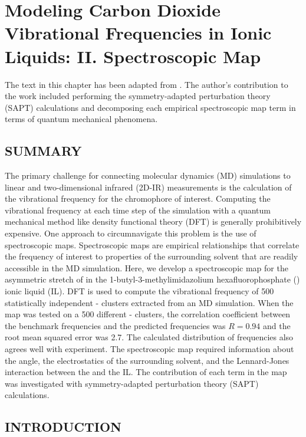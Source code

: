 \documentclass[%
  class = book,%
  crop = false,%
  float = true,%
  multi = true,%
  preview = false,%
]{standalone}
\newcommand{\caps}[1]{\uppercase{#1}}
\begin{document}
\chapter[\ce{CO2}-IL Spectroscopic Map Development]{Modeling Carbon Dioxide Vibrational Frequencies in Ionic Liquids: II. Spectroscopic Map}
\label{ch:paper_03}

The text in this chapter has been adapted from . The author's contribution to the work included performing the symmetry-adapted perturbation theory (SAPT) calculations and decomposing each empirical spectroscopic map term in terms of quantum mechanical phenomena.

\section{\texorpdfstring{\caps{Summary}}{Summary}}

The primary challenge for connecting molecular dynamics (MD) simulations to linear and two-dimensional infrared (2D-IR) measurements is the calculation of the vibrational frequency for the chromophore of interest. Computing the vibrational frequency at each time step of the simulation with a quantum mechanical method like density functional theory (DFT) is generally prohibitively expensive. One approach to circumnavigate this problem is the use of spectroscopic maps. Spectroscopic maps are empirical relationships that correlate the frequency of interest to properties of the surrounding solvent that are readily accessible in the MD simulation. Here, we develop a spectroscopic map for the asymmetric stretch of  in the 1-butyl-3-methylimidazolium hexafluorophosphate (\ce{[C4C1im][PF6]}) ionic liquid (IL). DFT is used to compute the vibrational frequency of \num{500} statistically independent -\ce{[C4C1im][PF6]} clusters extracted from an MD simulation. When the map was tested on a \num{500} different -\ce{[C4C1im][PF6]} clusters, the correlation coefficient between the benchmark frequencies and the predicted frequencies was \(R = 0.94\) and the root mean squared error was \SI{2.7}{\wavenumber}. The calculated distribution of frequencies also agrees well with experiment. The spectroscopic map required information about the  angle, the electrostatics of the surrounding solvent, and the Lennard-Jones interaction between the  and the IL. The contribution of each term in the map was investigated with symmetry-adapted perturbation theory (SAPT) calculations.

\section{\texorpdfstring{\caps{Introduction}}{Introduction}}
\label{paper_03:sec:I}
\end{document}
